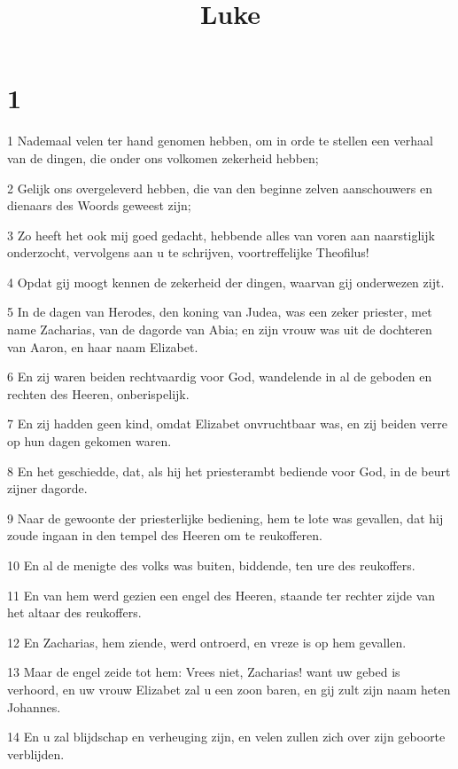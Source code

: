 

\title{Luke}



\chapter{1}

\par 1 Nademaal velen ter hand genomen hebben, om in orde te stellen een verhaal van de dingen, die onder ons volkomen zekerheid hebben;
\par 2 Gelijk ons overgeleverd hebben, die van den beginne zelven aanschouwers en dienaars des Woords geweest zijn;
\par 3 Zo heeft het ook mij goed gedacht, hebbende alles van voren aan naarstiglijk onderzocht, vervolgens aan u te schrijven, voortreffelijke Theofilus!
\par 4 Opdat gij moogt kennen de zekerheid der dingen, waarvan gij onderwezen zijt.
\par 5 In de dagen van Herodes, den koning van Judea, was een zeker priester, met name Zacharias, van de dagorde van Abia; en zijn vrouw was uit de dochteren van Aaron, en haar naam Elizabet.
\par 6 En zij waren beiden rechtvaardig voor God, wandelende in al de geboden en rechten des Heeren, onberispelijk.
\par 7 En zij hadden geen kind, omdat Elizabet onvruchtbaar was, en zij beiden verre op hun dagen gekomen waren.
\par 8 En het geschiedde, dat, als hij het priesterambt bediende voor God, in de beurt zijner dagorde.
\par 9 Naar de gewoonte der priesterlijke bediening, hem te lote was gevallen, dat hij zoude ingaan in den tempel des Heeren om te reukofferen.
\par 10 En al de menigte des volks was buiten, biddende, ten ure des reukoffers.
\par 11 En van hem werd gezien een engel des Heeren, staande ter rechter zijde van het altaar des reukoffers.
\par 12 En Zacharias, hem ziende, werd ontroerd, en vreze is op hem gevallen.
\par 13 Maar de engel zeide tot hem: Vrees niet, Zacharias! want uw gebed is verhoord, en uw vrouw Elizabet zal u een zoon baren, en gij zult zijn naam heten Johannes.
\par 14 En u zal blijdschap en verheuging zijn, en velen zullen zich over zijn geboorte verblijden.
